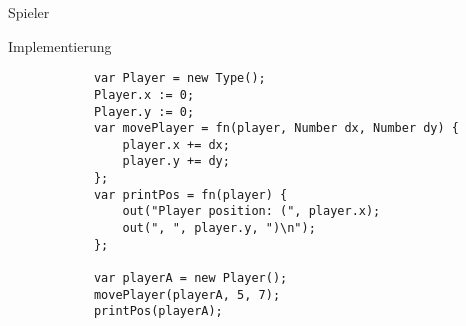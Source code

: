 \documentclass[ucs,9pt]{beamer}
\begin{document}
\begin{frame}[fragile]{Spieler}
	\begin{block}{Implementierung}
		\begin{lstlisting}
			var Player = new Type();
			Player.x := 0;
			Player.y := 0;
			var movePlayer = fn(player, Number dx, Number dy) {
			    player.x += dx;
			    player.y += dy;
			};
			var printPos = fn(player) {
			    out("Player position: (", player.x);
			    out(", ", player.y, ")\n");
			};

			var playerA = new Player();
			movePlayer(playerA, 5, 7);
			printPos(playerA);
		\end{lstlisting}
	\end{block}
\end{frame}
\end{document}
